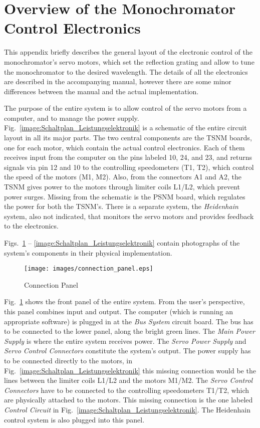 \clearpage
\section{Overview of the Monochromator Control Electronics}
\label{Overview of the Monochromator Control Electronics}

This appendix briefly describes the general layout of the electronic control of
the monochromator's servo motors, which set the reflection grating and allow to
tune the monochromator to the desired wavelength. The details of all the
electronics are described in the accompanying manual, however there are some
minor differences between the manual and the actual implementation.

The purpose of the entire system is to allow control of the servo motors
from a computer, and to manage the power supply.
Fig.~\ref{image:Schaltplan_Leistungselektronik} is a schematic of the entire
circuit layout in all its major parts. The two central components are the TSNM
boards, one for each motor, which contain the actual control electronics. Each
of them receives input from the computer on the pins labeled 10, 24, and 23, and
returns signals via pin 12 and 10 to the controlling speedometers (T1, T2),
which control the speed of the motors (M1, M2). Also, from the connectors A1 and
A2, the TSNM gives power to the motors through limiter coils L1/L2, which
prevent power surges. Missing from the schematic is the PSNM board, which
regulates the power for both the TSNM's. There is a separate system, the
\emph{Heidenhain} system, also not indicated, that monitors the servo motors and
provides feedback to the electronics.

Figs.~\ref{image:connection_panel} -- \ref{image:Schaltplan_Leistungselektronik}
contain photographs of the system's components in their physical implementation.

\begin{figure}[htbp]
    \centering
    \texttt{[image: images/connection\_panel.eps]}
    \caption{Connection Panel}
  \label{image:connection_panel}
\end{figure}

Fig.~\ref{image:connection_panel} shows the front panel of the entire system.
From the user's perspective, this panel combines input and output. The
computer (which is running an appropriate software) is plugged in at the
\emph{Bus System} circuit board. The bus has to be connected to the lower panel,
along the bright green lines. The \emph{Main Power Supply} is where the entire
system receives power. The \emph{Servo Power Supply} and \emph{Servo Control
Connectors} constitute the system's output. The power supply has to be connected
directly to the motors, in Fig.~\ref{image:Schaltplan_Leistungselektronik} this
missing connection would be the lines between the limiter coils L1/L2 and the
motors M1/M2. The \emph{Servo Control Connectors} have to be connected to the
controlling speedometers T1/T2, which are physically attached to the motors.
This missing connection is the one labeled \emph{Control Circuit} in
Fig.~\ref{image:Schaltplan_Leistungselektronik}. The Heidenhain control
system is also plugged into this panel.

